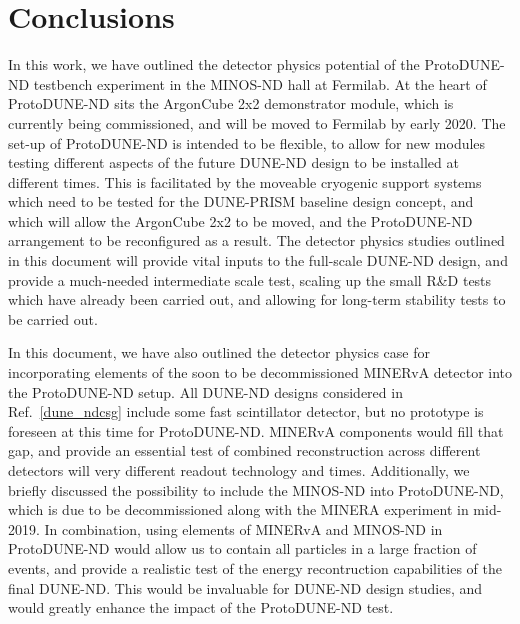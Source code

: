 \section{Conclusions}
\label{sec:conclusions}

In this work, we have outlined the detector physics potential of the ProtoDUNE-ND testbench experiment in the MINOS-ND hall at Fermilab. At the heart of ProtoDUNE-ND sits the ArgonCube 2x2 demonstrator module, which is currently being commissioned, and will be moved to Fermilab by early 2020. The set-up of ProtoDUNE-ND is intended to be flexible, to allow for new modules testing different aspects of the future DUNE-ND design to be installed at different times. This is facilitated by the moveable cryogenic support systems which need to be tested for the DUNE-PRISM baseline design concept, and which will allow the ArgonCube 2x2 to be moved, and the ProtoDUNE-ND arrangement to be reconfigured as a result. The detector physics studies outlined in this document will provide vital inputs to the full-scale DUNE-ND design, and provide a much-needed intermediate scale test, scaling up the small R\&D tests which have already been carried out, and allowing for long-term stability tests to be carried out.

In this document, we have also outlined the detector physics case for incorporating elements of the soon to be decommissioned MINERvA detector into the ProtoDUNE-ND setup. All DUNE-ND designs considered in Ref.~\ref{dune_ndcsg} include some fast scintillator detector, but no prototype is foreseen at this time for ProtoDUNE-ND. MINERvA components would fill that gap, and provide an essential test of combined reconstruction across different detectors will very different readout technology and times. Additionally, we briefly discussed the possibility to include the MINOS-ND into ProtoDUNE-ND, which is due to be decommissioned along with the MINERA experiment in mid-2019. In combination, using elements of MINERvA and MINOS-ND in ProtoDUNE-ND would allow us to contain all particles in a large fraction of events, and provide a realistic test of the energy recontruction capabilities of the final DUNE-ND. This would be invaluable for DUNE-ND design studies, and would greatly enhance the impact of the ProtoDUNE-ND test.
